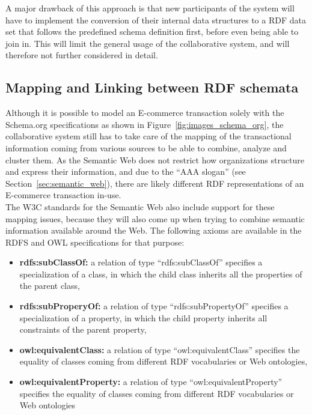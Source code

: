 A major drawback of this approach is that new participants of the system will have to implement the conversion of their internal data structures to a \gls{RDF} data set that follows the predefined schema definition first, before even being able to join in. This will limit the general usage of the collaborative system, and will therefore not further considered in detail.


\subsection{Mapping and Linking between \gls{RDF} schemata}

Although it is possible to model an \gls{E-commerce} transaction solely with the Schema.org specifications as shown in Figure~\ref{fig:images_schema_org}, the collaborative system still has to take care of the mapping of the transactional information coming from various sources to be able to combine, analyze and cluster them. As the Semantic Web does not restrict how organizations structure and express their information, and due to the ``AAA slogan'' (see Section~\ref{sec:semantic_web}), there are likely different \gls{RDF} representations of an \gls{E-commerce} transaction in-use. \\

The \gls{W3C} standards for the Semantic Web also include support for these mapping issues, because they will also come up when trying to combine semantic information available around the Web. The following axioms are available in the \gls{RDFS} and \gls{OWL} specifications for that purpose: \@

\begin{itemize}
	\item \textbf{rdfs:subClassOf:} a relation of type ``rdfs:subClassOf'' specifies a specialization of a class, in which the child class inherits all the properties of the parent class,
  \item \textbf{rdfs:subProperyOf:} a relation of type ``rdfs:subPropertyOf'' specifies a specialization of a property, in which the child property inherits all constraints of the parent property,
  \item \textbf{owl:equivalentClass:} a relation of type ``owl:equivalentClass'' specifies the equality of classes coming from different \gls{RDF} vocabularies or Web ontologies,
  \item \textbf{owl:equivalentProperty:} a relation of type ``owl:equivalentProperty'' specifies the equality of classes coming from different \gls{RDF} vocabularies or Web ontologies
\end{itemize}


